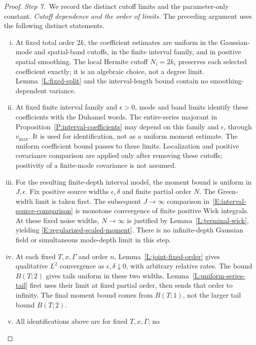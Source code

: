 \documentclass[12pt,oneside,openany]{book}
\numberwithin{equation}{section}
\theoremstyle{nogostyle}
\theoremstyle{definition}
\begin{document}
\begin{proof}
  \medskip
  \noindent\textit{Step 7.~}We record the distinct cutoff limits and the
  parameter-only constant.
  \emph{Cutoff dependence and the order of limits.} The preceding argument uses
  the following distinct statements.
  \begin{enumerate}[(i)]
    \item At fixed total order $2k$, the coefficient estimates are uniform
      in the Gaussian-mode and spatial-band cutoffs, in the finite interval
      family, and in positive spatial smoothing. The local Hermite cutoff $N_i =
      2k_i$ preserves each selected coefficient exactly; it is an algebraic
      choice, not a degree limit. Lemma~\ref{L:fixed-split} and the
      interval-length bound contain no smoothing-dependent variance.
    \item At fixed finite interval family and $\epsilon > 0$, mode and band
      limits identify these coefficients with the Duhamel words. The
      entire-series majorant in Proposition~\ref{P:interval-coefficients} may
      depend on this family and $\epsilon$, through $v_{\max}$. It is used for
      identification, not as a uniform moment estimate. The uniform coefficient
      bound passes to these limits. Localization and positive covariance
      comparison are applied only after removing these cutoffs; positivity of a
      finite-mode covariance is not assumed.
    \item For the resulting finite-depth interval model, the moment bound
      is uniform in $J,\epsilon$. Fix positive source widths $\epsilon,\delta$
      and finite partial order $N$. The Green-width limit is taken first. The
      subsequent $J \to \infty$ comparison
      in~\eqref{E:interval-source-comparison} is monotone convergence of finite
      positive Wick integrals. At these fixed noise widths, $N \to \infty$ is
      justified by Lemma~\ref{L:terminal-wick}, yielding
      \eqref{E:regularized-scaled-moment}. There is no infinite-depth Gaussian
      field or simultaneous mode-depth limit in this step.
    \item At each fixed $T,x,\Gamma$ and order $n$,
      Lemma~\ref{L:joint-fixed-order} gives qualitative $L^2$ convergence as
      $\epsilon,\delta\downarrow0$, with arbitrary relative rates. The bound
      $B(T;2)$ gives tails uniform in these two widths.
      Lemma~\ref{L:uniform-series-tail} first uses their limit at fixed partial
      order, then sends that order to infinity. The final moment bound comes
      from $B(T;1)$, not the larger tail bound $B(T;2)$.
    \item All identifications above are for fixed $T,x,\Gamma$; no

\end{enumerate}
\end{proof}
\end{document}
